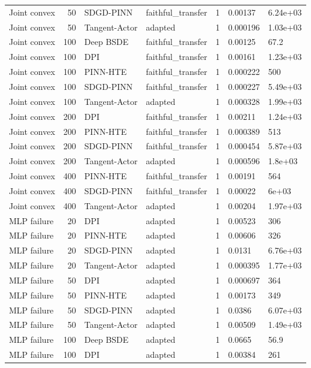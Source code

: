 \begin{tabular}{lrllrll}
Joint convex & 50 & SDGD-PINN & faithful\_transfer & 1 & 0.00137 & 6.24e+03 \\
Joint convex & 50 & Tangent-Actor & adapted & 1 & 0.000196 & 1.03e+03 \\
Joint convex & 100 & Deep BSDE & faithful\_transfer & 1 & 0.00125 & 67.2 \\
Joint convex & 100 & DPI & faithful\_transfer & 1 & 0.00161 & 1.23e+03 \\
Joint convex & 100 & PINN-HTE & faithful\_transfer & 1 & 0.000222 & 500 \\
Joint convex & 100 & SDGD-PINN & faithful\_transfer & 1 & 0.000227 & 5.49e+03 \\
Joint convex & 100 & Tangent-Actor & adapted & 1 & 0.000328 & 1.99e+03 \\
Joint convex & 200 & DPI & faithful\_transfer & 1 & 0.00211 & 1.24e+03 \\
Joint convex & 200 & PINN-HTE & faithful\_transfer & 1 & 0.000389 & 513 \\
Joint convex & 200 & SDGD-PINN & faithful\_transfer & 1 & 0.000454 & 5.87e+03 \\
Joint convex & 200 & Tangent-Actor & adapted & 1 & 0.000596 & 1.8e+03 \\
Joint convex & 400 & PINN-HTE & faithful\_transfer & 1 & 0.00191 & 564 \\
Joint convex & 400 & SDGD-PINN & faithful\_transfer & 1 & 0.00022 & 6e+03 \\
Joint convex & 400 & Tangent-Actor & adapted & 1 & 0.00204 & 1.97e+03 \\
MLP failure & 20 & DPI & adapted & 1 & 0.00523 & 306 \\
MLP failure & 20 & PINN-HTE & adapted & 1 & 0.00606 & 326 \\
MLP failure & 20 & SDGD-PINN & adapted & 1 & 0.0131 & 6.76e+03 \\
MLP failure & 20 & Tangent-Actor & adapted & 1 & 0.000395 & 1.77e+03 \\
MLP failure & 50 & DPI & adapted & 1 & 0.000697 & 364 \\
MLP failure & 50 & PINN-HTE & adapted & 1 & 0.00173 & 349 \\
MLP failure & 50 & SDGD-PINN & adapted & 1 & 0.0386 & 6.07e+03 \\
MLP failure & 50 & Tangent-Actor & adapted & 1 & 0.00509 & 1.49e+03 \\
MLP failure & 100 & Deep BSDE & adapted & 1 & 0.0665 & 56.9 \\
MLP failure & 100 & DPI & adapted & 1 & 0.00384 & 261 \\

\end{tabular}
